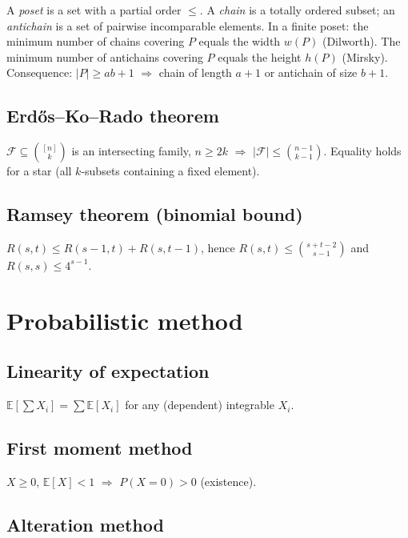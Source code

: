 A \textit{poset} is a set with a partial order $\le$. A \textit{chain} is a totally ordered subset; an \textit{antichain} is a set of pairwise incomparable elements. In a finite poset: the minimum number of chains covering $P$ equals the width $w(P)$ (Dilworth). The minimum number of antichains covering $P$ equals the height $h(P)$ (Mirsky). Consequence: $|P|\ge ab+1$ $\Rightarrow$ chain of length $a+1$ or antichain of size $b+1$.

\subsection{Erd\H{o}s--Ko--Rado theorem}
\label{subsec:erdos-ko-rado}

$\mathcal{F}\subseteq\binom{[n]}{k}$ is an intersecting family, $n\ge 2k$ $\Rightarrow$ $|\mathcal{F}|\le\binom{n-1}{k-1}$. Equality holds for a star (all $k$-subsets containing a fixed element).

\subsection{Ramsey theorem (binomial bound)}
\label{subsec:ramsey}

$R(s,t)\le R(s-1,t)+R(s,t-1)$, hence $R(s,t)\le\binom{s+t-2}{s-1}$ and $R(s,s)\le 4^{s-1}$.

\medskip

\section{Probabilistic method}
\label{sec:probabilistic-method}

\subsection{Linearity of expectation}
\label{subsec:linearity-expectation}

$\mathbb{E}[\sum X_i]=\sum\mathbb{E}[X_i]$ for any (dependent) integrable $X_i$.

\subsection{First moment method}
\label{subsec:first-moment}

$X\ge 0$, $\mathbb{E}[X]<1$ $\Rightarrow$ $P(X=0)>0$ (existence).

\subsection{Alteration method}
\label{subsec:alteration}

